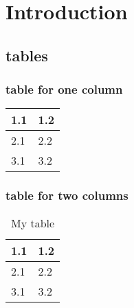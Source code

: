 \chapter{Introduction}

\section{tables}

\subsection{table for one column}
\blindtext[3]
\begin{Table}
  \begin{tabularx}{\textwidth}[htb]{X X}
    \toprule
    1.1 & 1.2 \\
    \midrule
    2.1 & 2.2 \\
    3.1 & 3.2 \\
    \bottomrule
  \end{tabularx}
\end{Table}

\subsection{table for two columns}
\blindtext{}
\begin{table*}
  \begin{tabularx}{\textwidth}{X X}
    \toprule
    1.1 & 1.2 \\
    \midrule
    2.1 & 2.2 \\
    3.1 & 3.2 \\
    \bottomrule
  \end{tabularx}
  \caption{My table}
\end{table*}
\blindtext{}
